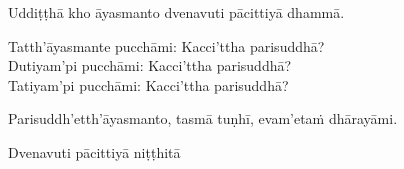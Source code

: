 \medskip

\begin{center}
	Uddiṭṭhā kho āyasmanto dvenavuti pācittiyā dhammā.

	\smallskip

	Tatth'āyasmante pucchāmi: Kacci'ttha parisuddhā?\\
	Dutiyam'pi pucchāmi: Kacci'ttha parisuddhā?\\
	Tatiyam'pi pucchāmi: Kacci'ttha parisuddhā?

	\smallskip

	Parisuddh'etth'āyasmanto, tasmā tuṇhī, evam'etaṁ dhārayāmi.
\end{center}

\begin{outro}
	Dvenavuti pācittiyā niṭṭhitā
\end{outro}

\clearpage

